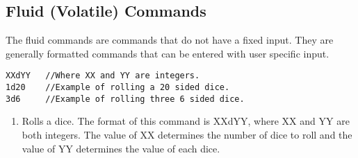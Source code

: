 \subsection{Fluid (Volatile) Commands}

The fluid commands are commands that do not have a fixed input. They are generally formatted commands that can be entered with user specific input.

\begin{lstlisting} 
XXdYY   //Where XX and YY are integers.
1d20    //Example of rolling a 20 sided dice.
3d6     //Example of rolling three 6 sided dice.
\end{lstlisting}
\begin{enumerate}
	\item[] Rolls a dice. The format of this command is XXdYY, where XX and YY are both integers. The value of XX determines the number of dice to roll and the value of YY determines the value of each dice.
\end{enumerate}